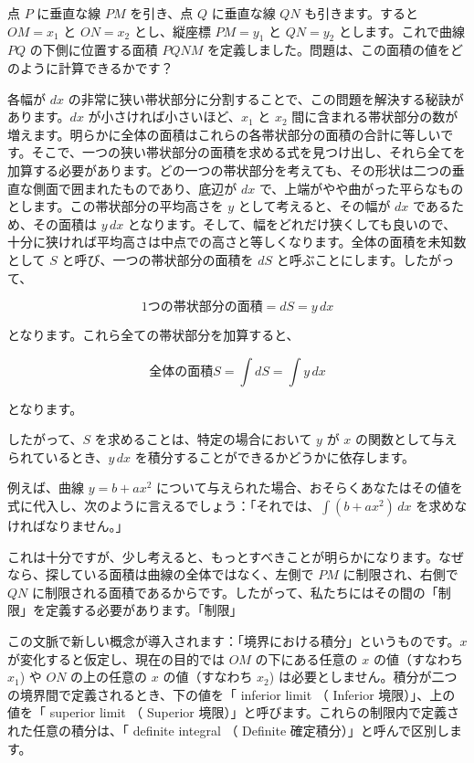 \documentclass[a4paper,11pt,openany]{ltjsbook}
\begin{document}
点 $P$ に垂直な線 $PM$ を引き、点 $Q$ に垂直な線 $QN$ も引きます。すると $OM = x_1$ と $ON = x_2$ とし、縦座標 $PM = y_1$ と $QN = y_2$ とします。これで曲線 $PQ$ の下側に位置する面積 $PQNM$ を定義しました。問題は、この面積の値をどのように計算できるかです？

各幅が $dx$ の非常に狭い帯状部分に分割することで、この問題を解決する秘訣があります。$dx$ が小さければ小さいほど、$x_1$ と $x_2$ 間に含まれる帯状部分の数が増えます。明らかに全体の面積はこれらの各帯状部分の面積の合計に等しいです。そこで、一つの狭い帯状部分の面積を求める式を見つけ出し、それら全てを加算する必要があります。どの一つの帯状部分を考えても、その形状は二つの垂直な側面で囲まれたものであり、底辺が $dx$ で、上端がやや曲がった平らなものとします。この帯状部分の平均高さを $y$ として考えると、その幅が $dx$ であるため、その面積は $y \, dx$ となります。そして、幅をどれだけ狭くしても良いので、十分に狭ければ平均高さは中点での高さと等しくなります。全体の面積を未知数として $S$ と呼び、一つの帯状部分の面積を $dS$ と呼ぶことにします。したがって、

\[
1\text{つの帯状部分の面積} = dS = y \, dx
\]

となります。これら全ての帯状部分を加算すると、

\[
全体の面積 S = \int dS = \int y \, dx
\]

となります。

したがって、$S$ を求めることは、特定の場合において $y$ が $x$ の関数として与えられているとき、$y \, dx$ を積分することができるかどうかに依存します。

例えば、曲線 \( y = b + ax^2 \) について与えられた場合、おそらくあなたはその値を式に代入し、次のように言えるでしょう：「それでは、\(\int (b + ax^2) \, dx\) を求めなければなりません。」 %

これは十分ですが、少し考えると、もっとすべきことが明らかになります。なぜなら、探している面積は曲線の全体ではなく、左側で \( PM \) に制限され、右側で \( QN \) に制限される面積であるからです。したがって、私たちにはその間の「制限」を定義する必要があります。「制限」 %

この文脈で新しい概念が導入されます：「境界における積分」というものです。\( x \) が変化すると仮定し、現在の目的では \( OM \) の下にある任意の \( x \) の値（すなわち \( x_1 \)) や \( ON \) の上の任意の \( x \) の値（すなわち \( x_2 \)) は必要としません。積分が二つの境界間で定義されるとき、下の値を「 inferior limit （ Inferior 境限）」、上の値を「 superior limit （ Superior 境限）」と呼びます。これらの制限内で定義された任意の積分は、「 definite integral （ Definite 確定積分）」と呼んで区別します。
\end{document}
